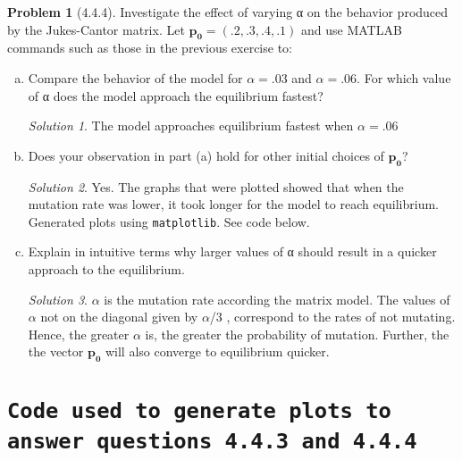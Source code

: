 \documentclass[11pt]{article}
\theoremstyle{definition}\newtheorem*{problem}{Problem}
\theoremstyle{remark}\newtheorem{claim}{Claim}
\theoremstyle{remark}\newtheorem*{sol}{Solution}
\begin{document}
\begin{problem}[4.4.4] Investigate the effect of varying α on the behavior produced by the Jukes-Cantor matrix. Let $\mathbf {p_0}=(.2,.3,.4,.1)$ and use MATLAB commands such as those in the previous exercise to:
\end{problem}
\begin{enumerate}[a.]
\item Compare the behavior of the model for $\alpha = .03$ and $\alpha = .06$. For which value of α does the model approach the equilibrium fastest?
\begin{sol}
The model approaches equilibrium fastest when $\alpha = .06$
\end{sol}

\item Does your observation in part (a) hold for other initial choices of $\mathbf {p_0}$? 
\begin{sol}
Yes. The graphs that were plotted showed that when the mutation rate was lower, it took longer for the model to reach equilibrium. Generated plots using \texttt{matplotlib}. See code below.

\end{sol}

\item Explain in intuitive terms why larger values of α should result in a quicker approach to the equilibrium.
\begin{sol}
$\alpha$ is the mutation rate according the matrix model. The values of $\alpha$ not on the diagonal given by  $\alpha$/3 , correspond to the rates of not mutating. Hence, the greater $\alpha$ is, the greater the probability of mutation. Further, the the vector $\mathbf {p_0}$ will also converge to equilibrium quicker.
\end{sol}
\end{enumerate}

\section{\texttt {Code used to generate plots to answer questions 4.4.3 and 4.4.4}}



\end{document}
